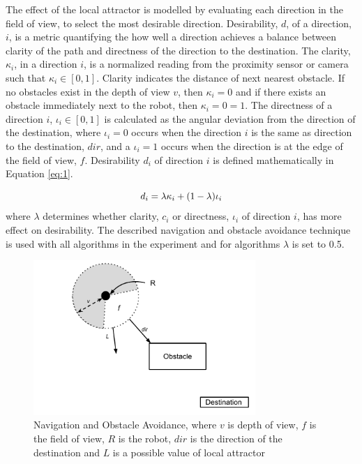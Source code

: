 The effect of the local attractor is modelled by  evaluating each direction in the field of view, to select the most desirable direction. Desirability, $d$, of a direction, $i$, is a metric quantifying the how well a direction achieves a balance between clarity of the path and directness of the direction to the destination. The clarity, $\kappa_i$, in a direction $i$, is a normalized reading from the proximity sensor or camera such that $\kappa_i\in[0,1]$. Clarity indicates the distance of next nearest obstacle. If no obstacles exist in the depth of view $v$, then  $\kappa_i=0$ and if there exists an obstacle immediately next to the robot, then $\kappa_i=0=1$. The directness of a direction $i$, $\iota_i\in[0,1]$ is calculated as the angular deviation from the direction of the destination, where $\iota_i=0$ occurs when the direction $i$ is the same as direction to the destination, $dir$, and a $\iota_i=1$ occurs when the direction is at the edge of the field of view, $f$. Desirability $d_i$ of direction $i$ is defined mathematically in Equation \ref{eq:1}.

\begin{equation}
	d_i= \lambda \kappa_i + (1 - \lambda)\iota_i \\
	\label{eq:1}
\end{equation} where $\lambda$ determines whether clarity, $c_i$ or directness, $\iota_i$ of direction $i$, has more effect on desirability. The described navigation and obstacle avoidance technique is used with all algorithms in the experiment and for algorithms $\lambda$ is set to 0.5.

\begin{figure}
	\centering
	\includegraphics[width=0.75\textwidth]{chapters/chapter5/figures/ObstacleAvoidance.pdf}
	\caption{Navigation and Obstacle Avoidance, where $v$ is depth of view, $f$ is the field of view, $R$ is the robot, $dir$ is the direction of the destination and $L$ is a possible value of local attractor}
	\label{fig:obstacleavoidance}
\end{figure}


